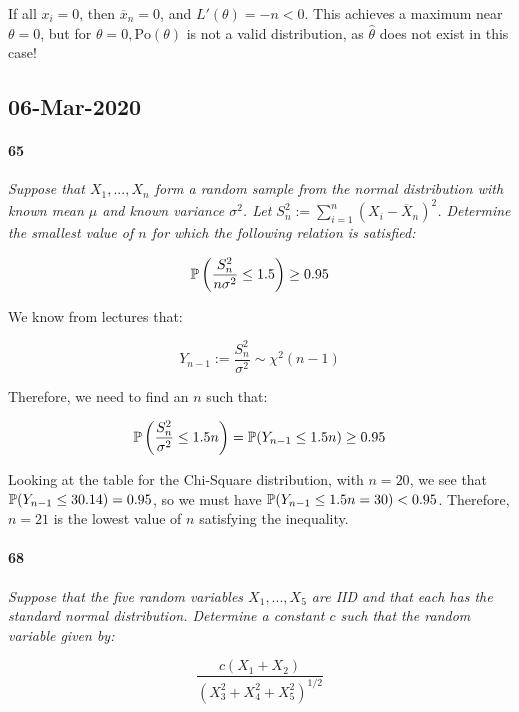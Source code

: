             If all $x_i = 0$, then $\overline x_n = 0$, and $L'(\theta) = -n
            < 0$. This achieves a maximum near $\theta = 0$, but for $\theta
            = 0, \text{Po}(\theta)$ is not a valid distribution, as
            $\widehat \theta$ does not exist in this case!

    \subsection*{06-Mar-2020}
        \paragraph{65}
        \textit{Suppose that $X_1, ..., X_n$ form a random sample from the
        normal distribution with known mean $\mu$ and known variance
        $\sigma^2$. Let $S_n^2 := \sum\limits_{i=1}^n (X_i - \overline
        X_n)^2$. Determine the smallest value of $n$ for which the following
        relation is satisfied:}

        \[
            \mathbb{P}\left(\frac{S_n^2}{n\sigma^2} \leq 1.5\right) \geq 0.95
        \]

            We know from lectures that:

            \[
                Y_{n-1} := \frac{S_n^2}{\sigma^2} \sim \chi^2(n - 1)
            \]

            Therefore, we need to find an $n$ such that:

            \[
                \mathbb{P}\left(\frac{S_n^2}{\sigma^2} \leq 1.5n\right) =
                \mathbb{P}(Y_{n-1} \leq 1.5n) \geq 0.95
            \]

            Looking at the table for the Chi-Square distribution, with $n =
            20$, we see that $\mathbb{P}(Y_{n-1} \leq 30.14) = 0.95$, so we must
            have $\mathbb{P}(Y_{n-1} \leq 1.5n = 30) < 0.95$. Therefore, $n =
            21$ is the lowest value of $n$ satisfying the inequality.

        \paragraph{68}
        \textit{Suppose that the five random variables $X_1, ..., X_5$ are
        IID and that each has the standard normal distribution. Determine a
        constant $c$ such that the random variable given by:}

        \[
            \frac{c(X_1 + X_2)}{(X_3^2 + X_4^2 + X_5^2)^{1/2}}
        \]

